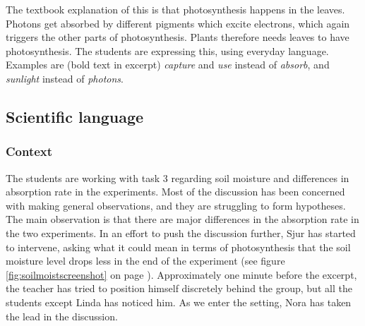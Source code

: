  The textbook explanation of this is that photosynthesis happens in the leaves. Photons get absorbed by different pigments which excite electrons, which again triggers the other parts of photosynthesis. Plants therefore needs leaves to have photosynthesis. The students are expressing this, using everyday language. Examples are (bold text in excerpt) \textit{capture} and \textit{use} instead of \textit{absorb}, and \textit{sunlight} instead of \textit{photons}. 

\subsection{Scientific language}
\subsubsection*{Context}
The students are working with task 3 regarding soil moisture and differences in absorption rate in the experiments. Most of the discussion has been concerned with making general observations, and they are struggling to form hypotheses. The main observation is that there are major differences in the absorption rate in the two experiments. In an effort to push the discussion further, Sjur has started to intervene, asking what it could mean in terms of photosynthesis that the soil moisture level drops less in the end of the experiment (see figure \ref{fig:soilmoistscreenshot} on page \pageref{fig:soilmoistscreenshot}). Approximately one minute before the excerpt, the teacher has tried to position himself discretely behind the group, but all the students except Linda has noticed him. As we enter the setting, Nora has taken the lead in the discussion.

